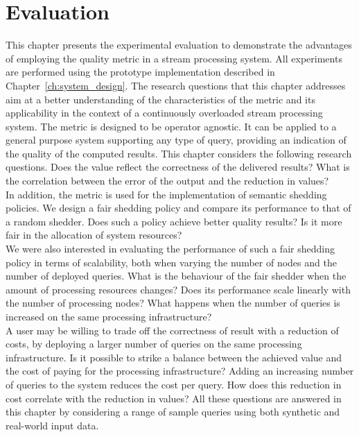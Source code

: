 \chapter{Evaluation}
\label{ch:evaluation}
\vspace{-25pt}
This chapter presents the experimental evaluation to demonstrate the advantages of employing the \sic
quality metric in a stream processing system. All experiments are performed using the \sys prototype
implementation described in Chapter~\ref{ch:system_design}.
The research questions that this chapter addresses aim at a better understanding of the characteristics
of the \sic metric and its applicability in the context of a continuously overloaded stream
processing system.
The \sic metric is designed to be operator agnostic. It can be applied to a general purpose
system supporting any type of query, providing an indication of the quality of the
computed results. This chapter considers the following research questions. Does the \sic value reflect
the correctness of the delivered results? 
What is the correlation between the error of the output and the reduction in \sic values?\\
In addition, the \sic metric is used for the implementation of semantic shedding policies.
We design a fair shedding policy and compare its performance to that of a random
shedder.
Does such a policy achieve better quality results? Is it more fair in the allocation of system
resources?\\
We were also interested in evaluating the performance of such a fair shedding policy in terms of
scalability, both when varying the number of nodes and the number of deployed queries.
What is the behaviour of the fair shedder when the amount of processing resources
changes? Does its performance scale linearly with the number of processing nodes? What happens when the
number of queries is increased on the same processing infrastructure? \\
A user may be willing to trade off the correctness of result with a reduction of costs, \eg by
deploying a larger number of queries on the same processing infrastructure. 
Is it possible to strike a balance between the achieved \sic value and the cost of paying for the
processing infrastructure? Adding an increasing number of queries to the system reduces the cost per
query.
How does this reduction in cost correlate with the reduction in \sic values? All these questions are
answered in this chapter by considering a range of sample queries using both synthetic and real-world
input data.


  







%



